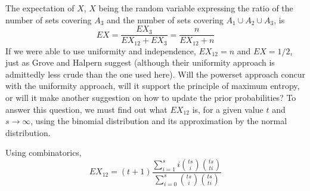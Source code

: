 \documentclass[12pt]{article}
\begin{document}
The expectation of $X$, $X$ being the random variable expressing the
ratio of the number of sets covering $A_{3}$ and the number of sets
covering $A_{1}\cup{}A_{2}\cup{}A_{3}$, is
\begin{displaymath}
  EX=\frac{EX_{3}}{EX_{12}+EX_{3}}=\frac{n}{EX_{12}+n}
\end{displaymath}
If we were able to use uniformity and independence, $EX_{12}=n$ and
$EX=1/2$, just as Grove and Halpern suggest (although their uniformity
approach is admittedly less crude than the one used here). Will the
powerset approach concur with the uniformity approach, will it support
the principle of maximum entropy, or will it make another suggestion
on how to update the prior probabilities? To answer this question, we
must find out what $EX_{12}$ is, for a given value $t$ and
$s\rightarrow\infty$, using the binomial distribution and its
approximation by the normal distribution.

Using combinatorics,
\begin{displaymath}
  EX_{12}=(t+1)\frac{\sum_{i=1}^{s}i\binom{ts}{i}\binom{ts}{ti}}{\sum_{i=0}^{s}\binom{ts}{i}\binom{ts}{ti}}
\end{displaymath}
\end{document}
